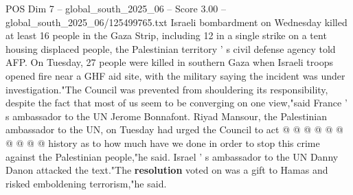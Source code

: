 \begin{textsample}{POS Dim 7 – global\_south\_2025\_06 – Score 3.00 – global\_south\_2025\_06/125499765.txt}
Israeli bombardment on Wednesday killed at least 16 people in the Gaza Strip, including 12 in a single strike on a tent housing displaced people, the Palestinian territory ' s civil defense agency told AFP.
On Tuesday, 27 people were killed in southern Gaza when Israeli troops opened fire near a GHF aid site, with the military saying the incident was under investigation."The Council was prevented from shouldering its responsibility, despite the fact that most of us seem to be converging on one view,"said France ' s ambassador to the UN Jerome Bonnafont.
Riyad Mansour, the Palestinian ambassador to the UN, on Tuesday had urged the Council to act @ @ @ @ @ @ @ @ @ @ history as to how much have we done in order to stop this crime against the Palestinian people,"he said.
Israel ' s ambassador to the UN Danny Danon attacked the text."The \textbf{resolution} voted on was a gift to Hamas and risked emboldening terrorism,"he said.

\end{textsample}
